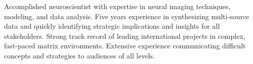 

\begin{cvparagraph}

Accomplished neuroscientist with expertise in neural imaging techniques, modeling, and data analysis. Five years experience in synthesizing multi-source data and quickly identifying strategic implications and insights for all stakeholders. Strong track record of leading international projects in complex, fast-paced matrix environments. Extensive experience communicating difficult concepts and strategies to audiences of all levels.


\end{cvparagraph}
